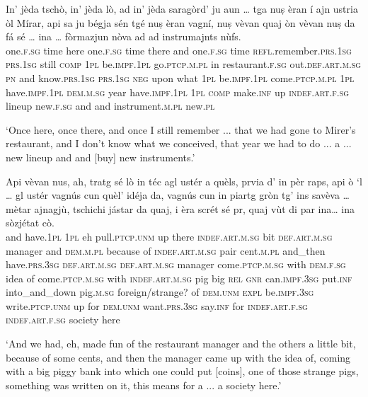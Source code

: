 \begin{linenumbers}
\gll    In’ jèda tschò, in’ jèda lò, ad in’ jèda saragòrd’ ju aun … tga nuṣ èran í ajn ustria òl Mírar, api sa ju bégja sén tgé nuṣ èran vagní, nuṣ vèvan quaj òn vèvan nuṣ da fá sé … ina … fòrmazjun nòva ad ad instrumajnts nùfs.\\
one.\textsc{f.sg} time here one.\textsc{f.sg} time there and one.\textsc{f.sg} time \textsc{refl}.remember.\textsc{prs.1sg} \textsc{prs.1sg} still {} \textsc{comp} \textsc{1pl} be.\textsc{impf.1pl} go.\textsc{ptcp.m.pl} in restaurant.\textsc{f.sg} out.\textsc{def.art.m.sg} \textsc{pn} and  know.\textsc{prs.1sg} \textsc{prs.1sg} \textsc{neg} upon what \textsc{1pl} be.\textsc{impf.1pl} come.\textsc{ptcp.m.pl} \textsc{1pl} have.\textsc{impf.1pl} \textsc{dem.m.sg} year have.\textsc{impf.1pl} \textsc{1pl} \textsc{comp} make.\textsc{inf} up {} \textsc{indef.art.f.sg} {} lineup  new.\textsc{f.sg} and and instrument.\textsc{m.pl} new.\textsc{pl}\\
\end{linenumbers}
\medskip
\glt `Once here, once there, and once I still remember ... that we had gone to Mirer's restaurant, and I don't know what we conceived, that year we had to do ... a ... new lineup and and [buy] new instruments.'
\medskip

\begin{linenumbers}
\gll  Api vèvan nus, ah, tratg sé lò in téc agl ustér a quèls, prvia d’ in pèr raps, api ò `l … gl ustér vagnús cun quèl’ idéja da, vagnús cun in piartg gròn tg’ ins savèva … mètar ajnagjù, tschichi jástar da quaj, i èra scrét sé pr, quaj vùt di par ina… ina sòzjétat cò.\\
and have.\textsc{1pl} \textsc{1pl} eh pull.\textsc{ptcp.unm} up there \textsc{indef.art.m.sg} bit \textsc{def.art.m.sg} manager and \textsc{dem.m.pl} because of \textsc{indef.art.m.sg} pair cent.\textsc{m.pl} and\_then have.\textsc{prs.3sg} \textsc{def.art.m.sg} {} \textsc{def.art.m.sg} manager  come.\textsc{ptcp.m.sg}  with \textsc{dem.f.sg} idea of come.\textsc{ptcp.m.sg} with \textsc{indef.art.m.sg} pig big \textsc{rel} \textsc{gnr} can.\textsc{impf.3sg} {} put.\textsc{inf} into\_and\_down pig.\textsc{m.sg} foreign/strange? of \textsc{dem.unm} \textsc{expl} be.\textsc{impf.3sg} write.\textsc{ptcp.unm} up for \textsc{dem.unm} want.\textsc{prs.3sg} say.\textsc{inf} for \textsc{indef.art.f.sg} \textsc{indef.art.f.sg} society here \\
\end{linenumbers}
\medskip
\glt `And we had, eh, made fun of the restaurant manager and the others a little bit, because of some cents, and then the manager came up with the idea of, coming with a big piggy bank into which one could put [coins], one of those strange pigs, something was written on it, this means for a ... a society here.'
\medskip

